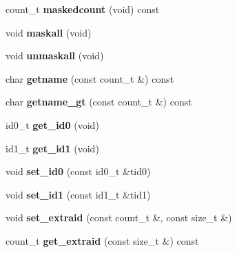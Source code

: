 \begin{DoxyCompactItemize}
\item 
\hypertarget{classLocus_a461ea95607c6e7d647cbd2f4eeeba298}{count\-\_\-t {\bfseries maskedcount} (void) const }\label{classLocus_a461ea95607c6e7d647cbd2f4eeeba298}

\item 
\hypertarget{classLocus_a2a93a9620b9888fe0e98824292fde309}{void {\bfseries maskall} (void)}\label{classLocus_a2a93a9620b9888fe0e98824292fde309}

\item 
\hypertarget{classLocus_a0dd16837f27a639becbd30d50e7f8165}{void {\bfseries unmaskall} (void)}\label{classLocus_a0dd16837f27a639becbd30d50e7f8165}

\item 
\hypertarget{classLocus_a8f524607e970e919b1a57d019fd96b14}{char {\bfseries getname} (const count\-\_\-t \&) const }\label{classLocus_a8f524607e970e919b1a57d019fd96b14}

\item 
\hypertarget{classLocus_a76abc341c0e718ebf91258ffc51e9a4f}{char {\bfseries getname\-\_\-gt} (const count\-\_\-t \&) const }\label{classLocus_a76abc341c0e718ebf91258ffc51e9a4f}

\item 
\hypertarget{classLocus_a3803ff2a28d2ddb138ef827e9b7b115a}{id0\-\_\-t {\bfseries get\-\_\-id0} (void)}\label{classLocus_a3803ff2a28d2ddb138ef827e9b7b115a}

\item 
\hypertarget{classLocus_a9f4e7ba54f0178fa6889e70cb8093a33}{id1\-\_\-t {\bfseries get\-\_\-id1} (void)}\label{classLocus_a9f4e7ba54f0178fa6889e70cb8093a33}

\item 
\hypertarget{classLocus_a2cf45eae6ce44630cc1a28016dd6566c}{void {\bfseries set\-\_\-id0} (const id0\-\_\-t \&tid0)}\label{classLocus_a2cf45eae6ce44630cc1a28016dd6566c}

\item 
\hypertarget{classLocus_a66609fcd5c7850ede53c9d6283b74473}{void {\bfseries set\-\_\-id1} (const id1\-\_\-t \&tid1)}\label{classLocus_a66609fcd5c7850ede53c9d6283b74473}

\item 
\hypertarget{classLocus_af133c8681c65ed62502519dfa87f0ff0}{void {\bfseries set\-\_\-extraid} (const count\-\_\-t \&, const size\-\_\-t \&)}\label{classLocus_af133c8681c65ed62502519dfa87f0ff0}

\item 
\hypertarget{classLocus_a1c4d5b147496126ee1dbf5d74b04fa15}{count\-\_\-t {\bfseries get\-\_\-extraid} (const size\-\_\-t \&) const }\label{classLocus_a1c4d5b147496126ee1dbf5d74b04fa15}


\end{DoxyCompactItemize}
